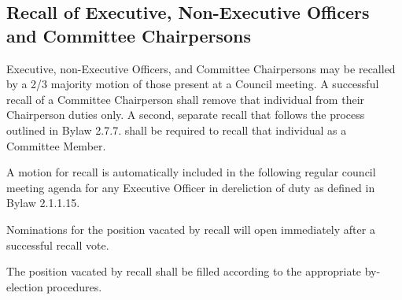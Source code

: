 \subsection {Recall of Executive, Non-Executive Officers and Committee  \hfill \break Chairpersons}
\begin{longenum}[ label*=\thesubsection.\arabic*., align=left]
	\item Executive, non-Executive Officers, and Committee Chairpersons may be recalled by a 2/3 majority motion of those present at a Council meeting. A successful recall of a Committee Chairperson shall remove that individual from their Chairperson duties only. A second, separate recall that follows the process outlined in Bylaw 2.7.7. shall be required to recall that individual as a Committee Member.
   \label{recall_non-exec}
    \item A motion for recall is automatically included in the following regular council meeting agenda for any Executive Officer in dereliction of duty as defined in Bylaw 2.1.1.15.
    \item Nominations for the position vacated by recall will open immediately after a successful recall vote.
    \item The position vacated by recall shall be filled according to the appropriate by-election procedures.
\end{longenum}

